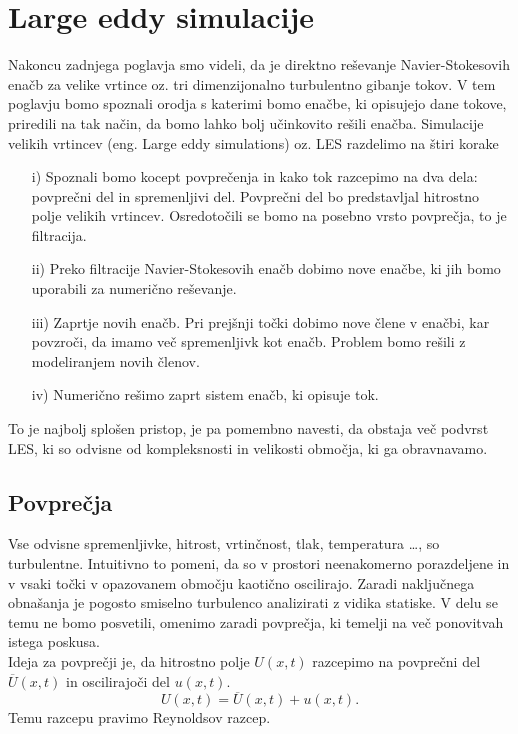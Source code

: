\documentclass[mat2, tisk]{fmfdelo}
\begin{document}
\newpage
\section{Large eddy simulacije}

Nakoncu zadnjega poglavja smo videli, da je direktno reševanje Navier-Stokesovih enačb 
za velike vrtince oz. tri dimenzijonalno turbulentno gibanje tokov. V tem poglavju 
bomo spoznali orodja s katerimi bomo enačbe, ki opisujejo dane tokove, priredili na tak
način, da bomo lahko bolj učinkovito rešili enačba. Simulacije velikih vrtincev (eng. 
Large eddy simulations) oz. LES razdelimo na štiri korake 
\begin{enumerate}
\item[i)] Spoznali bomo kocept povprečenja in kako tok razcepimo na dva dela: 
povprečni del in spremenljivi del. Povprečni del bo predstavljal hitrostno polje 
velikih vrtincev. Osredotočili se bomo na posebno vrsto povprečja, to je filtracija.
\item[ii)] Preko filtracije Navier-Stokesovih enačb dobimo nove enačbe, ki jih bomo 
uporabili za numerično reševanje. 
\item[iii)] Zaprtje novih enačb. Pri prejšnji točki dobimo nove člene v enačbi, kar 
povzroči, da imamo več spremenljivk kot enačb. Problem bomo rešili z modeliranjem 
novih členov.
\item[iv)] Numerično rešimo zaprt sistem enačb, ki opisuje tok.
\end{enumerate}

To je najbolj splošen pristop, je pa pomembno navesti, da obstaja več podvrst LES, 
ki so odvisne od kompleksnosti in velikosti območja, ki ga obravnavamo.

\subsection{Povprečja}

Vse odvisne spremenljivke, hitrost, vrtinčnost, tlak, temperatura \dots, so turbulentne.
Intuitivno to pomeni, da so v prostori neenakomerno porazdeljene in v vsaki točki v 
opazovanem območju kaotično oscilirajo. Zaradi naključnega obnašanja je pogosto smiselno turbulenco 
analizirati z vidika statiske. V delu se temu ne bomo posvetili, omenimo zaradi 
povprečja, ki temelji na več ponovitvah istega poskusa. \\
Ideja za povprečji je, da hitrostno polje $U(x, t)$ razcepimo na povprečni del $\overline{U}(x, t)$ in 
oscilirajoči del $u(x, t)$.
\begin{equation}
U(x, t) = \overline{U}(x,t) + u(x, t).
\end{equation}
Temu razcepu pravimo Reynoldsov razcep.
\end{document}
